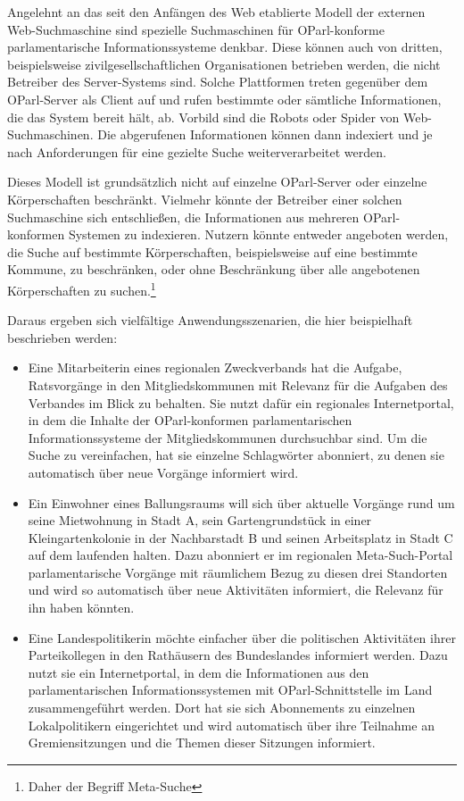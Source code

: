 \documentclass[,a4paper]{article}
\begin{document}
Angelehnt an das seit den Anfängen des Web etablierte Modell der
externen Web-Suchmaschine sind spezielle Suchmaschinen für
OParl-konforme parlamentarische Informationssysteme denkbar. Diese
können auch von dritten, beispielsweise zivilgesellschaftlichen
Organisationen betrieben werden, die nicht Betreiber des Server-Systems
sind. Solche Plattformen treten gegenüber dem OParl-Server als Client
auf und rufen bestimmte oder sämtliche Informationen, die das System
bereit hält, ab. Vorbild sind die Robots oder Spider von
Web-Suchmaschinen. Die abgerufenen Informationen können dann indexiert
und je nach Anforderungen für eine gezielte Suche weiterverarbeitet
werden.

Dieses Modell ist grundsätzlich nicht auf einzelne OParl-Server oder
einzelne Körperschaften beschränkt. Vielmehr könnte der Betreiber einer
solchen Suchmaschine sich entschließen, die Informationen aus mehreren
OParl-konformen Systemen zu indexieren. Nutzern könnte entweder
angeboten werden, die Suche auf bestimmte Körperschaften, beispielsweise
auf eine bestimmte Kommune, zu beschränken, oder ohne Beschränkung über
alle angebotenen Körperschaften zu suchen.\footnote{Daher der Begriff
  Meta-Suche}

Daraus ergeben sich vielfältige Anwendungsszenarien, die hier
beispielhaft beschrieben werden:

\begin{itemize}
\item
  Eine Mitarbeiterin eines regionalen Zweckverbands hat die Aufgabe,
  Ratsvorgänge in den Mitgliedskommunen mit Relevanz für die Aufgaben
  des Verbandes im Blick zu behalten. Sie nutzt dafür ein regionales
  Internetportal, in dem die Inhalte der OParl-konformen
  parlamentarischen Informationssysteme der Mitgliedskommunen
  durchsuchbar sind. Um die Suche zu vereinfachen, hat sie einzelne
  Schlagwörter abonniert, zu denen sie automatisch über neue Vorgänge
  informiert wird.
\item
  Ein Einwohner eines Ballungsraums will sich über aktuelle Vorgänge
  rund um seine Mietwohnung in Stadt A, sein Gartengrundstück in einer
  Kleingartenkolonie in der Nachbarstadt B und seinen Arbeitsplatz in
  Stadt C auf dem laufenden halten. Dazu abonniert er im regionalen
  Meta-Such-Portal parlamentarische Vorgänge mit räumlichem Bezug zu
  diesen drei Standorten und wird so automatisch über neue Aktivitäten
  informiert, die Relevanz für ihn haben könnten.
\item
  Eine Landespolitikerin möchte einfacher über die politischen
  Aktivitäten ihrer Parteikollegen in den Rathäusern des Bundeslandes
  informiert werden. Dazu nutzt sie ein Internetportal, in dem die
  Informationen aus den parlamentarischen Informationssystemen mit
  OParl-Schnittstelle im Land zusammengeführt werden. Dort hat sie sich
  Abonnements zu einzelnen Lokalpolitikern eingerichtet und wird
  automatisch über ihre Teilnahme an Gremiensitzungen und die Themen
  dieser Sitzungen informiert.
\end{itemize}
\end{document}
